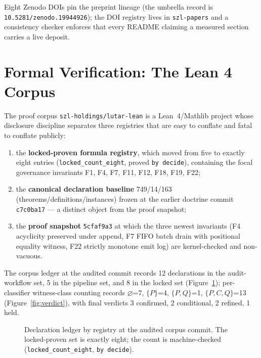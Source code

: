 ﻿\documentclass[11pt]{article}
\begin{document}
Eight Zenodo DOIs pin the preprint lineage (the umbrella record is \texttt{10.5281/zenodo.19944926}); the DOI registry lives in \texttt{szl-papers} and a consistency checker enforces that every README claiming a measured section carries a live deposit.

\section{Formal Verification: The Lean 4 Corpus}
\label{sec:lean}

The proof corpus \texttt{szl-holdings/lutar-lean} is a Lean~4/Mathlib project whose disclosure discipline separates three registries that are easy to conflate and fatal to conflate publicly:
\begin{enumerate}
\item the \textbf{locked-proven formula registry}, which moved from five to exactly eight entries (\texttt{locked\_count\_eight}, proved \texttt{by decide}), containing the focal governance invariants F1, F4, F7, F11, F12, F18, F19, F22;
\item the \textbf{canonical declaration baseline} 749/14/163 (theorems/definitions/instances) frozen at the earlier doctrine commit \texttt{c7c0ba17} --- a distinct object from the proof snapshot;
\item the \textbf{proof snapshot} \texttt{5cfaf9a3} at which the three newest invariants (F4 acyclicity preserved under append, F7 FIFO batch drain with positional equality witness, F22 strictly monotone emit log) are kernel-checked and non-vacuous.
\end{enumerate}

The corpus ledger at the audited commit records 12 declarations in the audit-workflow set, 5 in the pipeline set, and 8 in the locked set (Figure~\ref{fig:ledger}); per-classifier witness-class counting records $\varnothing$=7, $\{P\}$=4, $\{P,Q\}$=1, $\{P,C,Q\}$=13 (Figure~\ref{fig:verdict}), with final verdicts 3 confirmed, 2 conditional, 2 refined, 1 held.

\begin{figure}[htbp]
\centering
{}
\caption{Declaration ledger by registry at the audited corpus commit. The locked-proven set is exactly eight; the count is machine-checked (\texttt{locked\_count\_eight}, \texttt{by decide}).}
\label{fig:ledger}
\end{figure}
\end{document}
